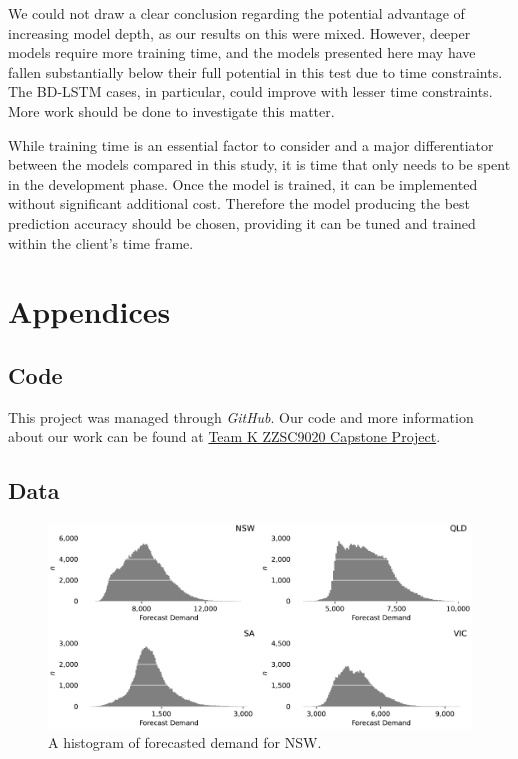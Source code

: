 \documentclass[mstat,12pt]{unswthesis}
\begin{document}
We could not draw a clear conclusion regarding the potential advantage of increasing model depth, as our results on this were mixed. However, deeper models require more training time, and the models presented here may have fallen substantially below their full potential in this test due to time constraints. The BD-LSTM cases, in particular, could improve with lesser time constraints. More work should be done to investigate this matter.

While training time is an essential factor to consider and a major differentiator between the models compared in this study, it is time that only needs to be spent in the development phase. Once the model is trained, it can be implemented without significant additional cost. Therefore the model producing the best prediction accuracy should be chosen, providing it can be tuned and trained within the client's time frame.




\hypertarget{appendices}{%
\chapter*{Appendices}\label{appendix}}

\renewcommand*\thesection{A.\arabic{section}} %

\hypertarget{code}{\section{Code}\label{code}}

This project was managed through \textit{GitHub}. Our code and more information about our work can be found at \href{https://github.com/mango-unchained/Team-K---ZZSC9020-Capstone-Project}{Team K ZZSC9020 Capstone Project}.

\hypertarget{data}{\section{Data}\label{data}}

\renewcommand*\thetable{A.\arabic{table}} %
\renewcommand*\thefigure{A.\arabic{figure}} %

\begin{figure}[H]
\centerline{\includegraphics[width=0.8\columnwidth]{Final Report/Figures/Plots/Forecast demand histogram.pdf}}
\caption{A histogram of forecasted demand for NSW.}
\label{fdemand}
\end{figure}
\end{document}
